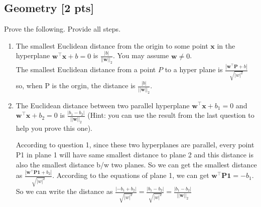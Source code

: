 \documentclass[a4paper]{article}
\theoremstyle{definition}
\newenvironment{soln}{
    \leavevmode\color{blue}\ignorespaces
}{}
\begin{document}
\subsection{Geometry [2 pts]}
Prove the following.  Provide all steps.
\begin{enumerate}
\item 	The smallest Euclidean distance from the origin to some point $\mathbf{x}$ in the hyperplane $\mathbf{w}^\top\mathbf{x} + b = 0$ is $\frac{|b|}{||\mathbf{w}||_2}$.  You may assume $\mathbf{w} \neq 0$.\\
\begin{soln}  The smallest Euclidean distance from a point $P$ to a hyper plane is $\frac{|\mathbf{w}^\top\mathbf{P} + b|}{\sqrt{|w|^2}}$ \\ so, when P is the orgin, the distance is $\frac{|b|}{||\mathbf{w}||_2}$. \end{soln}

\item 	The Euclidean distance between two parallel hyperplane $\mathbf{w}^\top\mathbf{x} + b_1 = 0$ and $\mathbf{w}^\top\mathbf{x} + b_2 = 0$ is $\frac{|b_1 - b_2|}{||\mathbf{w}||_2}$ (Hint: you can use the result from the last question to help you prove this one).

\begin{soln}  According to question 1, since these two hyperplanes are parallel, every point P1 in plane 1 will have same smallest distance to plane 2 and this distance is also the smallest distance b/w two planes. So we can get the smallest distance as $\frac{|\mathbf{w}^\top\mathbf{P1} + b_2|}{\sqrt{|w|^2}}$. According to the equations of plane 1, we can get $\mathbf{w}^\top\mathbf{P1} = -b_1$. So we can write the distance as $\frac{|-b_1+ b_2|}{\sqrt{|w|^2}} =\frac{|b_1- b_2|}{\sqrt{|w|^2}} =\frac{|b_1- b_2|}{||\mathbf{w}||_2}  $
\end{soln}

\end{enumerate}
\end{document}
